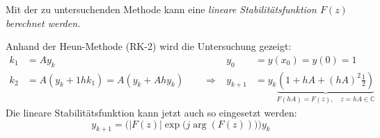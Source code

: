       Mit der zu untersuchenden Methode kann eine \em lineare Stabilitätsfunktion \em $F(z)$
      berechnet werden.
      
       Anhand der Heun-Methode (RK-2) wird die Untersuchung gezeigt:
      \begin{align*}
        k_1 &= A y_k                                          & y_0 &= y(x_0) = y(0) = 1\\
        k_2 &= A(y_k + 1 h k_1) = A(y_k + Ah y_k) \qquad \Longrightarrow &
        y_{k+1} &= y_k \underbrace{\left(1 + hA + (hA)^2 \frac12\right)}_{F(hA) = F(z), \quad z=hA \in \mathbb{C}}
      \end{align*}
      Die lineare Stabilitätsfunktion kann jetzt auch so eingesetzt werden:
      $$y_{k+1} = \Big( | F(z) | \exp \big(j \arg(F(z))\big) \Big) y_k$$
      
